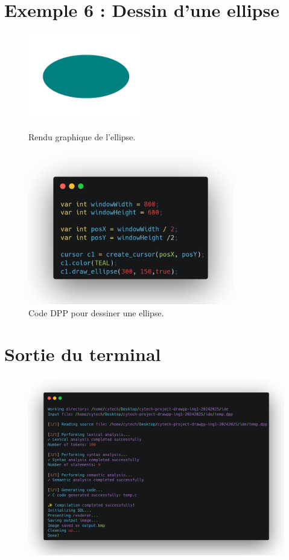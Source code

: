 \documentclass[12pt,a4paper]{report}
\begin{document}
\section{Exemple 6 : Dessin d'une ellipse}
\begin{figure}[H]
    \centering
    \includegraphics[width=0.45\textwidth]{assets/render/draw_ellipse.png}
    \caption{Rendu graphique de l'ellipse.}
    \includegraphics[width=0.8\textwidth]{assets/code/draw_ellipse_dpp.png}
    \caption{Code DPP pour dessiner une ellipse.}
\end{figure}

\newpage

\section{Sortie du terminal}
\begin{figure}[H]
    \centering
    \includegraphics[width=1\textwidth]{assets/terminal/terminal_output_after_run.png}
\end{figure}
\end{document}
